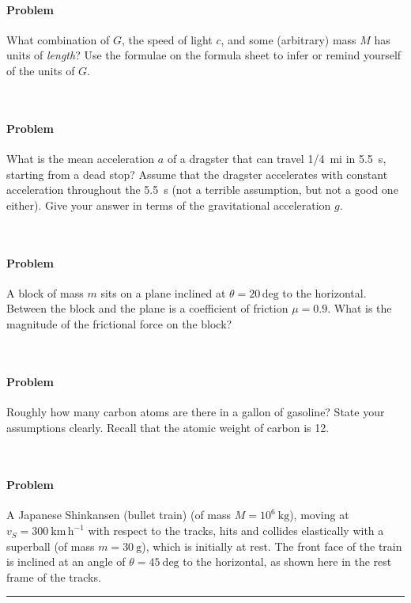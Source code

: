 \documentclass[12pt]{article}
\renewcommand{\deg}{\mathrm{deg}}
\newcounter{problem}
\begin{document}
\clearpage

\paragraph{Problem~\theproblem}%
What combination of $G$, the speed of light $c$, and some (arbitrary)
mass $M$ has units of \emph{length}?  Use the formulae on the formula
sheet to infer or remind yourself of the units of $G$.

~ \vfill ~

\paragraph{Problem~\theproblem}%
What is the mean acceleration $a$ of a dragster that can travel 1/4~mi
in 5.5~s, starting from a dead stop?  Assume that the dragster
accelerates with constant acceleration throughout the 5.5~s (not a
terrible assumption, but not a good one either).  Give your answer in
terms of the gravitational acceleration $g$.

~ \vfill ~

\clearpage

\paragraph{Problem~\theproblem}%
A block of mass $m$ sits on a plane inclined at $\theta=20\,\deg$ to
the horizontal.  Between the block and the plane is a coefficient of
friction $\mu=0.9$.  What is the magnitude of the frictional force on
the block?

~ \vfill ~

\paragraph{Problem~\theproblem}%
Roughly how many carbon atoms are there in a gallon of gasoline?
State your assumptions clearly.  Recall that the atomic weight of
carbon is 12.

~ \vfill ~

\clearpage

\paragraph{Problem~\theproblem}%
A Japanese Shinkansen (bullet train) (of mass $M=10^6~\mathrm{kg}$),
moving at $v_S=300~\mathrm{km\,h^{-1}}$ with respect to the tracks,
hits and collides elastically with a superball (of mass
$m=30~\mathrm{g}$), which is initially at rest.  The front face of the
train is inclined at an angle of $\theta=45~\mathrm{deg}$ to the
horizontal, as shown here in the rest frame of the tracks.\\
\rule{0.1\textwidth}{0pt}
\end{document}
